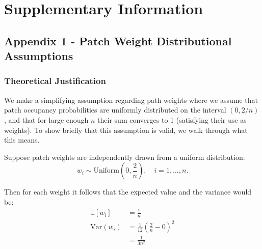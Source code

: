 
\onecolumn %
\fancyhead{} %
\renewcommand{\floatpagefraction}{0.1}
\lfoot[\bSupInf]{\dAuthor}
\rfoot[\dAuthor]{\cSupInf}
\newpage

\captionsetup*{format=largeformat} %
\setcounter{figure}{0} %
\setcounter{equation}{0} %
\makeatletter 
\renewcommand{\thefigure}{S\@arabic\c@figure} %
\makeatother
\def\theequation{S\arabic{equation}}


\newpage
\section*{Supplementary Information}

\subsection*{Appendix 1 - Patch Weight Distributional Assumptions}\label{sec:app-1}

\subsubsection*{Theoretical Justification}

We make a simplifying assumption regarding path weights where we assume that patch occupancy probabilities are uniformly distributed on the interval $(0,2/n)$, and that for large enough $n$ their sum converges to 1 (satisfying their use as weights). To show briefly that this assumption is valid, we walk through what this means. 

Suppose patch weights are independently drawn from a uniform distribution:
\begin{equation}
w_i \sim \text{Uniform}\left(0, \frac{2}{n}\right), \quad i = 1, \dots, n.
\end{equation}

Then for each weight it follows that the expected value and the variance would be:
\begin{align}
     \mathbb{E}[w_i] &=  \frac{1}{n}\\
     \text{Var}(w_i) &= \frac{1}{12} \left(\frac{2}{n} - 0\right)^2 \\
     &=  \frac{1}{3n^2}
\end{align}


